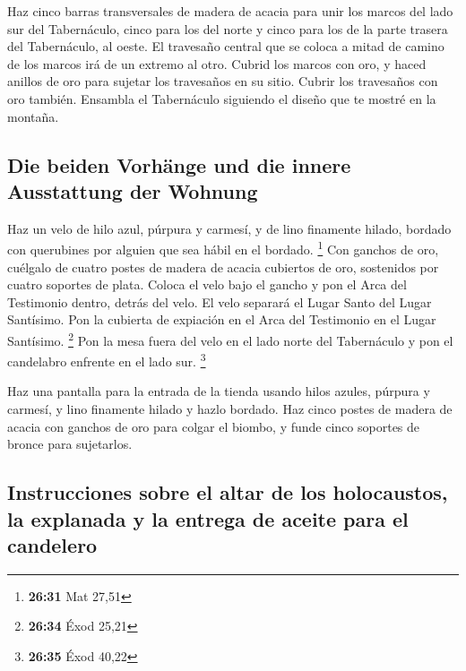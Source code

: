  Haz cinco barras transversales de madera de acacia para
unir los marcos del lado sur del Tabernáculo,  cinco para
los del norte y cinco para los de la parte trasera del Tabernáculo, al
oeste.  El travesaño central que se coloca a mitad de
camino de los marcos irá de un extremo al otro.  Cubrid
los marcos con oro, y haced anillos de oro para sujetar los travesaños
en su sitio. Cubrir los travesaños con oro también. 
Ensambla el Tabernáculo siguiendo el diseño que te mostré en la montaña.

\hypertarget{die-beiden-vorhuxe4nge-und-die-innere-ausstattung-der-wohnung}{%
\subsection{Die beiden Vorhänge und die innere Ausstattung der
Wohnung}\label{die-beiden-vorhuxe4nge-und-die-innere-ausstattung-der-wohnung}}

 Haz un velo de hilo azul, púrpura y carmesí, y de lino
finamente hilado, bordado con querubines por alguien que sea hábil en el
bordado. \footnote{\textbf{26:31} Mat 27,51}  Con ganchos
de oro, cuélgalo de cuatro postes de madera de acacia cubiertos de oro,
sostenidos por cuatro soportes de plata.  Coloca el velo
bajo el gancho y pon el Arca del Testimonio dentro, detrás del velo. El
velo separará el Lugar Santo del Lugar Santísimo.  Pon la
cubierta de expiación en el Arca del Testimonio en el Lugar Santísimo.
\footnote{\textbf{26:34} Éxod 25,21}  Pon la mesa fuera
del velo en el lado norte del Tabernáculo y pon el candelabro enfrente
en el lado sur. \footnote{\textbf{26:35} Éxod 40,22}

 Haz una pantalla para la entrada de la tienda usando
hilos azules, púrpura y carmesí, y lino finamente hilado y hazlo
bordado.  Haz cinco postes de madera de acacia con
ganchos de oro para colgar el biombo, y funde cinco soportes de bronce
para sujetarlos.

\hypertarget{instrucciones-sobre-el-altar-de-los-holocaustos-la-explanada-y-la-entrega-de-aceite-para-el-candelero}{%
\subsection{Instrucciones sobre el altar de los holocaustos, la
explanada y la entrega de aceite para el
candelero}\label{instrucciones-sobre-el-altar-de-los-holocaustos-la-explanada-y-la-entrega-de-aceite-para-el-candelero}}

